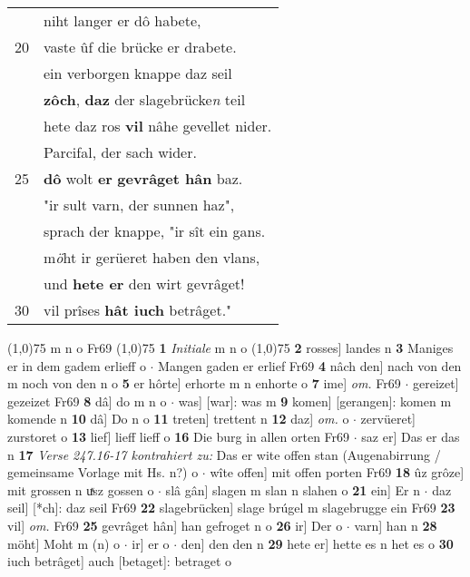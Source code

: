 \documentclass[8pt,a4paper,notitlepage]{article}
\begin{document}
\begin{table}[ht]
\begin{minipage}[t]{0.5\linewidth}
\begin{tabular}{rl}
 & niht langer er dô habete,\\ 
20 & vaste ûf die brücke er drabete.\\ 
 & ein verborgen knappe daz seil\\ 
 & \textbf{zôch}, \textbf{daz} der slagebrücke\textit{n} teil\\ 
 & hete daz ros \textbf{vil} nâhe gevellet nider.\\ 
 & Parcifal, der sach wider.\\ 
25 & \textbf{dô} wolt \textbf{er} \textbf{gevrâget hân} baz.\\ 
 & "ir sult varn, der sunnen haz",\\ 
 & sprach der knappe, "ir sît ein gans.\\ 
 & m\textit{ö}ht ir gerüeret haben den vlans,\\ 
 & und \textbf{hete er} den wirt gevrâget!\\ 
30 & vil prîses \textbf{hât iuch} betrâget."\\ 
\end{tabular}
\scriptsize
\line(1,0){75} \newline
m n o Fr69 \newline
\line(1,0){75} \newline
\textbf{1} \textit{Initiale} m n o  \newline
\line(1,0){75} \newline
\textbf{2} rosses] landes n \textbf{3} Maniges er in dem gadem erlieff o  $\cdot$ Mangen gaden er erlief Fr69 \textbf{4} nâch den] nach von den m noch von den n o \textbf{5} er hôrte] erhorte m n enhorte o \textbf{7} ime] \textit{om.} Fr69  $\cdot$ gereizet] gezeizet Fr69 \textbf{8} dâ] do m n o  $\cdot$ was] [war]: was m \textbf{9} komen] [gerangen]: komen m komende n \textbf{10} dâ] Do n o \textbf{11} treten] trettent n \textbf{12} daz] \textit{om.} o  $\cdot$ zervüeret] zurstoret o \textbf{13} lief] lieff lieff o \textbf{16} Die burg in allen orten Fr69  $\cdot$ saz er] Das er das n \textbf{17} \textit{Verse 247.16-17 kontrahiert zu:} Das er wite offen stan (Augenabirrung / gemeinsame Vorlage mit Hs. n?) o   $\cdot$ wîte offen] mit offen porten Fr69 \textbf{18} ûz grôze] mit grossen n uͯsz gossen o  $\cdot$ slâ gân] slagen m slan n slahen o \textbf{21} ein] Er n  $\cdot$ daz seil] [*ch]: daz seil Fr69 \textbf{22} slagebrücken] slage brúgel m slagebrugge ein Fr69 \textbf{23} vil] \textit{om.} Fr69 \textbf{25} gevrâget hân] han gefroget n o \textbf{26} ir] Der o  $\cdot$ varn] han n \textbf{28} möht] Moht m (n) o  $\cdot$ ir] er o  $\cdot$ den] den den n \textbf{29} hete er] hette es n het es o \textbf{30} iuch betrâget] auch [betaget]: betraget o \newline
\end{minipage}
\end{table}
\end{document}
